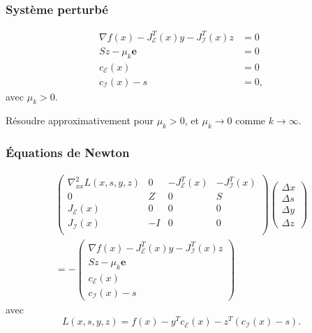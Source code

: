 \documentclass[usepdftitle=false,aspectratio=169]{beamer}
\def\cE{\mathcal{E}}
\def\cI{\mathcal{I}}
\def\be{\boldsymbol{e}}
\begin{document}
\begin{frame}
\frametitle{Système perturbé}

\begin{align*}
\nabla f(x) - J^T_{\cE}(x) y - J^T_{\cI} (x) z &= 0 \\
Sz - \mu_k \be &= 0 \\
c_{\cE}(x) &= 0 \\
c_{\cI}(x) -s &= 0,
\end{align*}
avec $\mu_k > 0$.

\mbox{}

Résoudre approximativement pour $\mu_k > 0$, et $\mu_k \rightarrow 0$ comme $k \rightarrow \infty$.

\end{frame}

\begin{frame}
\frametitle{Équations de Newton}

\begin{multline*}
\begin{pmatrix}
\nabla^2_{xx} L(x,s,y,z) & 0 & - J^T_{\cE}(x) & - J^T_{\cI}(x) \\
0 & Z & 0 & S \\
J_{\cE}(x) & 0 & 0 & 0 \\
J_{\cI}(x) & -I & 0 & 0 \\
\end{pmatrix}
\begin{pmatrix}
\Delta x \\
\Delta s \\
\Delta y \\
\Delta z	
\end{pmatrix}
\\
= -\begin{pmatrix}
\nabla f(x) - J^T_{\cE}(x) y - J^T_{\cI} (x) z \\
Sz - \mu_k \be \\
c_{\cE}(x) \\
c_{\cI}(x)-s
\end{pmatrix}
\end{multline*}
avec
$$
L(x,s,y,z) = f(x) - y^Tc_{\cE}(x) - z^T\left( c_{\cI}(x) - s \right).
$$

\end{frame}
\end{document}
